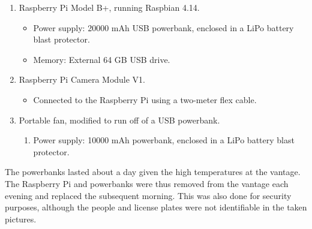 \documentclass[a4paper, 11pt]{article} %
\begin{document}
		\begin{enumerate}
			\setlength\itemsep{-3mm}
			\item Raspberry Pi Model B+, running Raspbian 4.14.
			\begin{itemize}
				\item[] Power supply: 20000 mAh USB powerbank, enclosed in a LiPo battery blast protector.
				\item[] Memory: External 64 GB USB drive.
			\end{itemize}
			\item Raspberry Pi Camera Module V1.
			\begin{itemize}
				\item[] Connected to the Raspberry Pi using a two-meter flex cable.
			\end{itemize}
			\item Portable fan, modified to run off of a USB powerbank.
			\begin{enumerate}
				\item[] Power supply: 10000 mAh powerbank, enclosed in a LiPo battery blast protector.
			\end{enumerate}
		\end{enumerate}
		The powerbanks lasted about a day given the high temperatures at the vantage. The Raspberry Pi 
		and powerbanks were thus removed from the vantage each evening and replaced the subsequent 
		morning. This was also done for security purposes, although the people and license plates were not 
		identifiable in the taken pictures.
	
\end{document}
